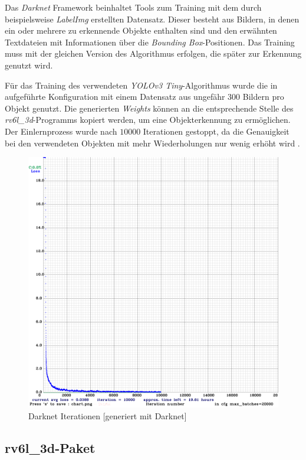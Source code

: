 Das \textit{Darknet} Framework beinhaltet Tools zum Training mit dem durch beispielsweise \textit{LabelImg} erstellten Datensatz. Dieser besteht aus Bildern, in denen ein oder mehrere zu erkennende Objekte enthalten sind und den erwähnten Textdateien mit Informationen über die \textit{Bounding Box}-Positionen. Das Training muss mit der gleichen Version des Algorithmus erfolgen, die später zur Erkennung genutzt wird.

Für das Training des verwendeten \textit{YOLOv3 Tiny}-Algorithmus wurde die in  aufgeführte Konfiguration mit einem Datensatz aus ungefähr 300 Bildern pro Objekt genutzt. Die generierten \textit{Weights} können an die entsprechende Stelle des \textit{rv6l\_3d}-Programms kopiert werden, um eine Objekterkennung zu ermöglichen. Der Einlernprozess wurde nach $10000$ Iterationen gestoppt, da die Genauigkeit bei den verwendeten Objekten mit mehr Wiederholungen nur wenig erhöht wird .

\begin{figure}[ht]
    \centering
    \includegraphics[width=\textwidth]{Bilder/darknet_iterationen.png}
    \caption{Darknet Iterationen [generiert mit Darknet]}
    \label{fig:darknet_iterationen}
\end{figure}

\pagebreak
\subsection{rv6l\_3d-Paket} \label{subsec:rv6l_3d}

